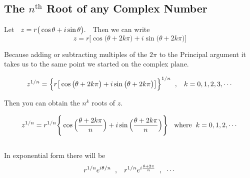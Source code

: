 \documentclass[11pt,a4paper]{article}
\begin{document}


\begin{figure}[H]
\centering
{}
\end{figure}









\subsection{The $n^{\text{th}}$ Root of any Complex Number}

Let $\hspace{0.2cm} z = r\big(\cos \theta + i\sin \theta \big).\hspace{0.2cm}$ Then we can write 
$$ z = r\big[\cos \big(\theta + 2k\pi\big) + i \sin \big( \theta + 2k \pi\big) \big]$$

Because adding or subtracting multiples of the $2\pi$ to the Principal argument it takes us to the same point we started on the complex plane.

$$ z^{1/n} = \Big\{r\big[\cos \big(\theta + 2k\pi\big) + i \sin \big( \theta + 2k \pi\big) \big]\Big\}^{1/n}\hspace{0.2cm}, \hspace{0.3cm} k = 0, 1,2,3,\cdots$$

Then you can obtain the $n^k$ roots of $z$.

$$z^{1/n} = r^{1/n} \Bigg\{ \cos\Big(\dfrac{\theta + 2k\pi}{n}\Big) + i \sin \Big(\dfrac{\theta + 2k\pi}{n}\Big)\Bigg\}\hspace{0.3cm}\text{where}\hspace{0.2cm} k = 0,1,2,\cdots$$\\



In exponential form there will be $$r^{1/n}e^{i\theta /n}\hspace{0.2cm} , \hspace{0.3cm} r^{1/n}e^{i\frac{\theta + 2\pi}{n}}\hspace{0.2cm} ,\hspace{0.2cm}\cdots$$
\end{document}
